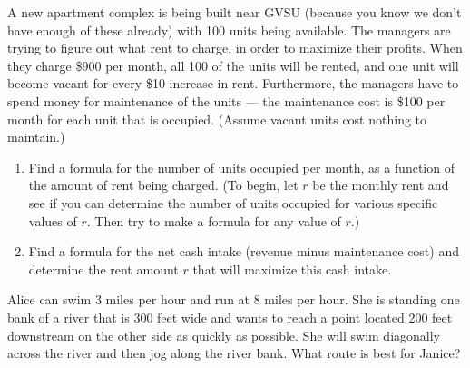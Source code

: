 \documentclass[11pt,letterpaper]{article}
\newenvironment{problem}[2][Problem]{\begin{trivlist}
\item[\hskip \labelsep {\bfseries #1}\hskip \labelsep {\bfseries #2.}]}{\end{trivlist}}
\begin{document}
\begin{problem}{2}
A new apartment complex is being built near GVSU (because you know we don't have enough of these already) with 100 units being available. The managers are trying to figure out what rent to charge, in order to maximize their profits. When they charge \$900 per month, all 100 of the units will be rented, and one unit will become vacant for every \$10 increase in rent. Furthermore, the managers have to spend money for maintenance of the units --- the maintenance cost is \$100 per month for each unit that is occupied. (Assume vacant units cost nothing to maintain.) 
\begin{enumerate}
    \item Find a formula for the number of units occupied per month, as a function of the amount of rent being charged. (To begin, let $r$ be the monthly rent and see if you can determine the number of units occupied for various specific values of $r$. Then try to make a formula for any value of $r$.) 
    \item Find a formula for the net cash intake (revenue minus maintenance cost) and determine the rent amount $r$ that will maximize this cash intake. 
\end{enumerate}
\end{problem}

\begin{problem}{3} Alice can swim 3 miles per hour and run at 8 miles per hour. She is standing one bank of a river that is 300 feet wide and wants to reach a point located 200 feet downstream on the other side as quickly as possible. She will swim diagonally across the river and then jog along the river bank. What route is best for Janice? 

\end{problem}
\end{document}
